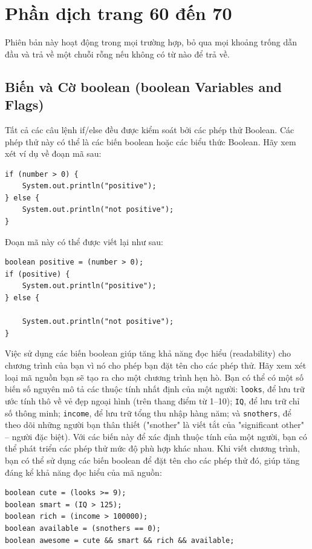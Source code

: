 \section{Phần dịch trang 60 đến 70}
Phiên bản này hoạt động trong mọi trường hợp, bỏ qua mọi khoảng trống dẫn đầu và trả về một chuỗi rỗng nếu không có từ nào để trả về.

\subsection*{Biến và Cờ boolean (boolean Variables and Flags)}

Tất cả các câu lệnh if/else đều được kiểm soát bởi các phép thử Boolean. Các phép thử này có thể là các biến boolean hoặc các biểu thức Boolean. Hãy xem xét ví dụ về đoạn mã sau:

\begin{verbatim}
if (number > 0) {
    System.out.println("positive");
} else {
    System.out.println("not positive");
}
\end{verbatim}

Đoạn mã này có thể được viết lại như sau:

\begin{verbatim}
boolean positive = (number > 0);
if (positive) {
    System.out.println("positive");
} else {

    System.out.println("not positive");
}
\end{verbatim}

Việc sử dụng các biến boolean giúp tăng khả năng đọc hiểu (readability) cho chương trình của bạn vì nó cho phép bạn đặt tên cho các phép thử. Hãy xem xét loại mã nguồn bạn sẽ tạo ra cho một chương trình hẹn hò. Bạn có thể có một số biến số nguyên mô tả các thuộc tính nhất định của một người: \texttt{looks}, để lưu trữ ước tính thô về vẻ đẹp ngoại hình (trên thang điểm từ 1--10); \texttt{IQ}, để lưu trữ chỉ số thông minh; \texttt{income}, để lưu trữ tổng thu nhập hàng năm; và \texttt{snothers}, để theo dõi những người bạn thân thiết ("snother" là viết tắt của "significant other" -- người đặc biệt). Với các biến này để xác định thuộc tính của một người, bạn có thể phát triển các phép thử mức độ phù hợp khác nhau. Khi viết chương trình, bạn có thể sử dụng các biến boolean để đặt tên cho các phép thử đó, giúp tăng đáng kể khả năng đọc hiểu của mã nguồn:

\begin{verbatim}
boolean cute = (looks >= 9);
boolean smart = (IQ > 125);
boolean rich = (income > 100000);
boolean available = (snothers == 0);
boolean awesome = cute && smart && rich && available;
\end{verbatim}

